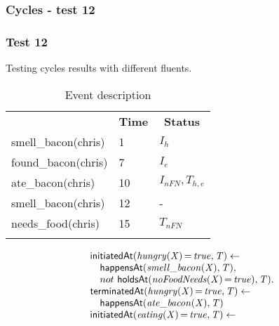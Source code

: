 \documentclass[8pt]{beamer}
\DeclareMathOperator{\val}{=}  %
\def \patsize {}
\def\happensAt{\textsf{\patsize happensAt}}
\def\holdsAt{\textsf{\patsize holdsAt}}
\def\initiatedAt{\textsf{\patsize initiatedAt}}
\def\terminatedAt{\textsf{\patsize terminatedAt}}
\newenvironment{mysplit}%
  {\arraycolsep 0pt \begin{array}{l}}%
  {\end{array}}
\begin{document}
\begin{frame}
    \frametitle{Cycles - test 12}
    \subsubsection{Test 12}
    \small
    Testing cycles results with different fluents.\linebreak
    \begin{minipage}{0.4\linewidth}
        \begin{table}[t!]
            \caption{Event description}
            \begin{center}

                \begin{tabular}{lll}
                    \hline\noalign{\smallskip}
                    \multicolumn{1}{l}{\textbf{Event}} & \multicolumn{1}{c}{\textbf{Time}} & \multicolumn{1}{c}{\textbf{Status}} \\
                    smell\_bacon(chris)& 1 & $I_{h}$\\
                    found\_bacon(chris)& 7 & $I_{e}$\\
                    ate\_bacon(chris)& 10  & $I_{nFN},T_{h,e}$\\
                    smell\_bacon(chris)& 12 & -\\
                    needs\_food(chris)& 15 & $T_{nFN}$\\
                    \noalign{\smallskip}
                    \hline
                \end{tabular}
            \end{center}
        \end{table}
    \end{minipage}
    \begin{minipage}{0.55\linewidth}
        \begin{align*}
            \begin{mysplit}
                \initiatedAt\mathit{(hungry(X)\val true,T)\leftarrow}\\
                \quad    \happensAt\mathit{(smell\_bacon(X),T),}\\
                \quad    not\ \holdsAt\mathit{(noFoodNeeds(X)\val true),T).}\\
                \terminatedAt\mathit{(hungry(X)\val true,T)\leftarrow}\\
                \quad    \happensAt\mathit{(ate\_bacon(X),T)}\\
                \initiatedAt\mathit{(eating(X)\val true,T)\leftarrow}\\

\end{mysplit}
\end{align*}
\end{minipage}
\end{frame}
\end{document}

